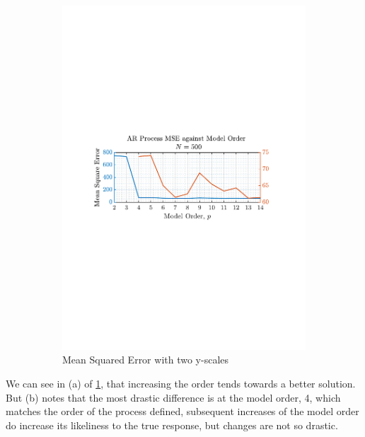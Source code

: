 \documentclass[12pt]{article}
\numberwithin{equation}{section}
\begin{document}
\begin{figure}[H]
\begin{subfigure}{0.49\textwidth}
			\includegraphics[trim={2.2cm 11.2cm 3.15cm  11.2cm}, clip, width=\textwidth]{../MATLAB/figures/q1_4b_fig16.pdf} 
			\captionsetup{justification=centering}
			\caption{Mean Squared Error with two y-scales}
		\end{subfigure}
		\captionsetup{justification=centering}
		\caption{}
		\label{fig: 1-4b}
	\end{figure}

	We can see in (a) of \ref{fig: 1-4b}, that increasing the order tends towards a better solution. But (b) notes that the most drastic difference is at the model order, 4, which matches the order of the process defined, subsequent increases of the model order do increase its likeliness to the true response, but changes are not so drastic.
	
\end{document}
